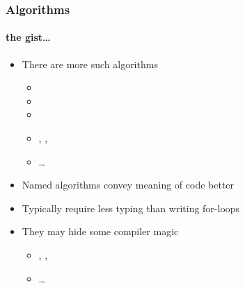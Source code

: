 \documentclass[aspectratio=169,compress,table,xcolor=table]{beamer}
\begin{document}
\begin{frame}
  \frametitle{Algorithms}
  \framesubtitle{the gist\ldots}
  \larger
  \begin{itemize}
    \item There are more such algorithms
    \begin{itemize}
      \item {}
      \item {}
      \item {}
      \item {}, , 
      \item \ldots
    \end{itemize}
    \item Named algorithms convey meaning of code better
    \item Typically require less typing than writing for-loops
    \item They may hide some compiler magic
    \begin{itemize}
      \item {}, ,
      \item \ldots
    \end{itemize}
  \end{itemize}
\end{frame}
\end{document}

